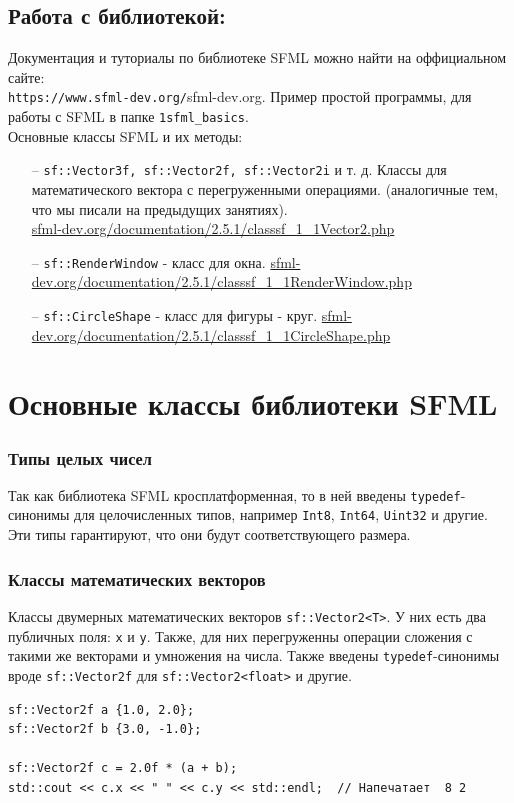 \documentclass{article}
\begin{document}
\subsection*{Работа с библиотекой:}
Документация и туториалы по библиотеке SFML можно найти на оффициальном сайте:\\ \texttt{https://www.sfml-dev.org/}{sfml-dev.org}. Пример простой программы, для работы с SFML в папке \texttt{1sfml\_basics}. \\
Основные классы SFML и их методы:
\begin{itemize}
\item[--] \texttt{sf::Vector3f, sf::Vector2f, sf::Vector2i} и т. д. Классы для математического вектора с перегруженными операциями. (аналогичные тем, что мы писали на предыдущих занятиях). \\
\href{https://www.sfml-dev.org/documentation/2.5.1/classsf_1_1Vector2.php}{sfml-dev.org/documentation/2.5.1/classsf\_1\_1Vector2.php}
\item[--] \texttt{sf::RenderWindow} - класс для окна.
\href{https://www.sfml-dev.org/documentation/2.5.1/classsf_1_1RenderWindow.php}{sfml-dev.org/documentation/2.5.1/classsf\_1\_1RenderWindow.php}
\item[--] \texttt{sf::CircleShape} - класс для фигуры - круг.
\href{https://www.sfml-dev.org/documentation/2.5.1/classsf_1_1CircleShape.php}{sfml-dev.org/documentation/2.5.1/classsf\_1\_1CircleShape.php}
\end{itemize}
\fi


\newpage
\section{Основные классы библиотеки SFML}
\subsubsection*{Типы целых чисел}
Так как библиотека SFML кросплатформенная, то в ней введены \texttt{typedef}-синонимы для целочисленных типов, например \texttt{Int8}, \texttt{Int64}, \texttt{Uint32} и другие. Эти типы гарантируют, что они будут соответствующего размера.

\subsubsection*{Классы математических векторов}
Классы двумерных математических векторов \texttt{sf::Vector2<T>}. У них есть два публичных поля: \texttt{x} и \texttt{y}. Также, для них перегруженны операции сложения с такими же векторами и умножения на числа. Также введены \texttt{typedef}-синонимы вроде \texttt{sf::Vector2f} для \texttt{sf::Vector2<float>} и другие.
\begin{lstlisting}
sf::Vector2f a {1.0, 2.0};
sf::Vector2f b {3.0, -1.0};

sf::Vector2f c = 2.0f * (a + b);
std::cout << c.x << " " << c.y << std::endl;  // Напечатает  8 2
\end{lstlisting}
\end{document}
